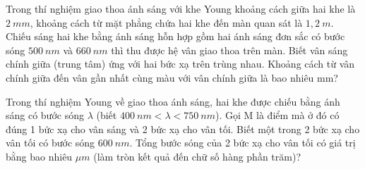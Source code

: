 \begin{ex}
Trong thí nghiệm giao thoa ánh sáng với khe Young khoảng cách giữa hai khe là $2\ mm$, khoảng cách từ mặt phẳng chứa hai khe đến màn quan sát là $1,2\ m$. Chiếu sáng hai khe bằng ánh sáng hỗn hợp gồm hai ánh sáng đơn sắc có bước sóng $500\ nm$ và $660\ nm$ thì thu được hệ vân giao thoa trên màn. Biết vân sáng chính giữa (trung tâm) ứng với hai bức xạ trên trùng nhau. Khoảng cách từ vân chính giữa đến vân gần nhất cùng màu với vân chính giữa là bao nhiêu mm?
\end{ex}










\begin{ex}
Trong thí nghiệm Young về giao thoa ánh sáng, hai khe được chiếu bằng ánh sáng có bước sóng $\lambda$ (biết $400\ nm < \lambda < 750\ nm$). Gọi M là điểm mà ở đó có đúng 1 bức xạ cho vân sáng và 2 bức xạ cho vân tối. Biết một trong 2 bức xạ cho vân tối có bước sóng $600\ nm$. Tổng bước sóng của 2 bức xạ cho vân tối có giá trị bằng bao nhiêu $\mu m$ (làm tròn kết quả đến chữ số hàng phần trăm)?
\end{ex}
